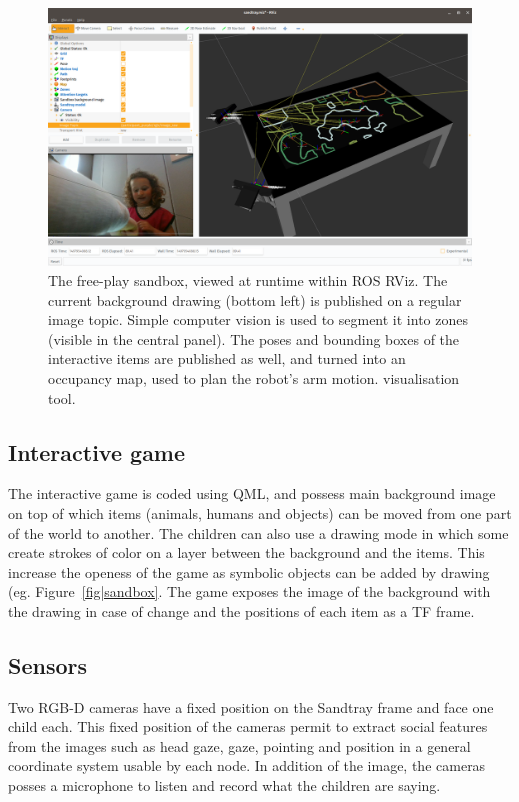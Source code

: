 \documentclass[sigconf]{acmart}
\begin{document}
\begin{figure}
    \centering
    \includegraphics[width=\linewidth]{rviz-sandtray}
    \caption{The free-play sandbox, viewed at runtime within ROS RViz. The
    current background drawing (bottom left) is published on a regular image
    topic. Simple computer vision is used to segment it into zones (visible in
    the central panel). The poses and bounding boxes of the interactive items
    are published as well, and turned into an occupancy map, used to plan the
    robot's arm motion.
    visualisation tool.}
    \label{fig|rviz}
\end{figure}

\subsection{Interactive game}
The interactive game is coded using QML, and possess main background image on
top of which items (animals, humans and objects) can be moved from one part of
the world to another. The children can also use a drawing mode in which some
create strokes of color on a layer between the background and the items. This
increase the openess of the game as symbolic objects can be added by drawing
(eg. Figure~\ref{fig|sandbox}. The game exposes the image of the background
with the drawing in case of change and the positions of each item as a TF frame.

\subsection{Sensors}
Two RGB-D cameras have a fixed position on the Sandtray frame and face one child
each. This fixed position of the cameras permit to extract social features from
the images such as head gaze, gaze, pointing and position in a general
coordinate system usable by each node. In addition of the image, the cameras
posses a microphone to listen and record what the children are saying.
\end{document}
